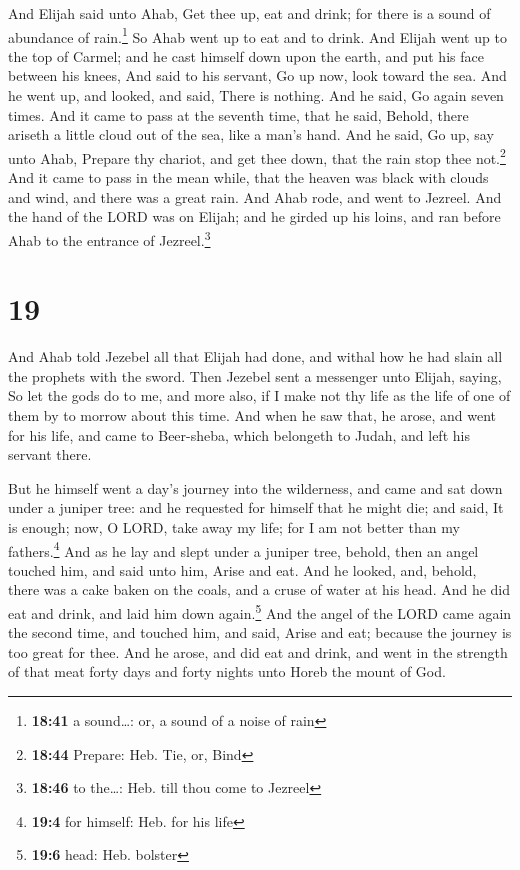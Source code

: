  And Elijah said unto Ahab, Get thee up, eat and drink;
for there is a sound of abundance of rain.\footnote{\textbf{18:41} a
  sound\ldots: or, a sound of a noise of rain}  So Ahab
went up to eat and to drink. And Elijah went up to the top of Carmel;
and he cast himself down upon the earth, and put his face between his
knees,  And said to his servant, Go up now, look toward
the sea. And he went up, and looked, and said, There is nothing. And he
said, Go again seven times.  And it came to pass at the
seventh time, that he said, Behold, there ariseth a little cloud out of
the sea, like a man's hand. And he said, Go up, say unto Ahab, Prepare
thy chariot, and get thee down, that the rain stop thee not.\footnote{\textbf{18:44}
  Prepare: Heb. Tie, or, Bind}  And it came to pass in
the mean while, that the heaven was black with clouds and wind, and
there was a great rain. And Ahab rode, and went to Jezreel.
 And the hand of the LORD was on Elijah; and he girded up
his loins, and ran before Ahab to the entrance of Jezreel.\footnote{\textbf{18:46}
  to the\ldots: Heb. till thou come to Jezreel}

\hypertarget{section-18}{%
\section{19}\label{section-18}}

 And Ahab told Jezebel all that Elijah had done, and
withal how he had slain all the prophets with the sword. 
Then Jezebel sent a messenger unto Elijah, saying, So let the gods do to
me, and more also, if I make not thy life as the life of one of them by
to morrow about this time.  And when he saw that, he
arose, and went for his life, and came to Beer-sheba, which belongeth to
Judah, and left his servant there.

 But he himself went a day's journey into the wilderness,
and came and sat down under a juniper tree: and he requested for himself
that he might die; and said, It is enough; now, O LORD, take away my
life; for I am not better than my fathers.\footnote{\textbf{19:4} for
  himself: Heb. for his life}  And as he lay and slept
under a juniper tree, behold, then an angel touched him, and said unto
him, Arise and eat.  And he looked, and, behold, there was
a cake baken on the coals, and a cruse of water at his head. And he did
eat and drink, and laid him down again.\footnote{\textbf{19:6} head:
  Heb. bolster}  And the angel of the LORD came again the
second time, and touched him, and said, Arise and eat; because the
journey is too great for thee.  And he arose, and did eat
and drink, and went in the strength of that meat forty days and forty
nights unto Horeb the mount of God.

